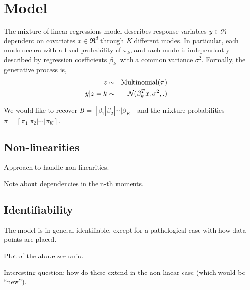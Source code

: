 \section{Model}
\label{sec:model}

\newcommand{\xn}[1]{x^{(#1)}}
\newcommand{\xni}{\xn{i}}
\newcommand{\yn}[1]{y^{(#1)}}
\newcommand{\yni}{\yn{i}}

The mixture of linear regressions model describes response variables $y
\in \Re$ dependent on covariates $x \in \Re^d$ through $K$ different
modes. In particular, each mode occurs with a fixed probability of
$\pi_k$, and each mode is independently described by regression
coefficients $\beta_k$, with a common variance $\sigma^2$. Formally, the
generative process is,
\begin{eqnarray}
  z &\sim& \operatorname{Multinomial}(\pi) \\
  y | z = k &\sim& \mathcal{N}( \beta_{k}^T x, \sigma^2 , .)
\end{eqnarray}

We would like to recover $B = [\beta_1 | \beta_2 | \cdots | \beta_K]$
and the mixture probabilities $\pi = [\pi_1 | \pi_2 | \cdots | \pi_K]$.

\subsection{Non-linearities}

Approach to handle non-linearities. 

Note about dependencies in the n-th moments. 

\subsection{Identifiability}

The model is in general identifiable, except for a pathological case
with how data points are placed.

Plot of the above scenario.

Interesting question; how do these extend in the non-linear case (which
would be ``new'').


